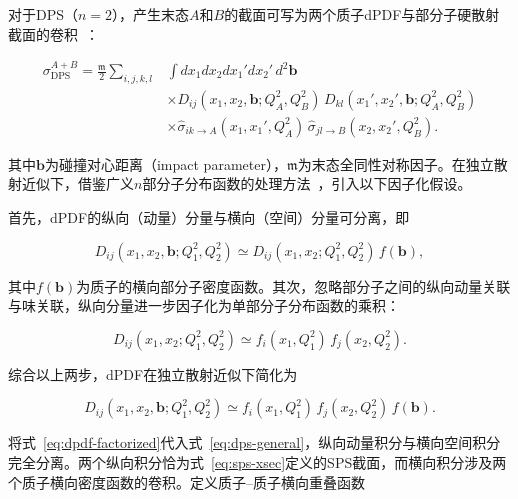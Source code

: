 对于DPS（$n=2$），产生末态$A$和$B$的截面可写为两个质子dPDF与部分子硬散射截面的卷积~\cite{Diehl:2018:DPS-theory,denterriaDoubleTripleNparton2017}：

\begin{equation}
  \label{eq:dps-general}
  \begin{aligned}
    \sigma_{\mathrm{DPS}}^{A+B}
    =
    \frac{\mathfrak{m}}{2} \sum_{i,j,k,l}
    &\int dx_1 dx_2 dx_1' dx_2' \, d^2\mathbf{b} \\
    &\times D_{ij}(x_1, x_2, \mathbf{b}; Q_A^2, Q_B^2) \,
       D_{kl}(x_1', x_2', \mathbf{b}; Q_A^2, Q_B^2) \\
    &\times \hat{\sigma}_{ik \to A}(x_1, x_1', Q_A^2) \,
       \hat{\sigma}_{jl \to B}(x_2, x_2', Q_B^2) .
  \end{aligned}
\end{equation}

其中$\mathbf{b}$为碰撞对心距离（impact parameter），$\mathfrak{m}$为末态全同性对称因子。在独立散射近似下，借鉴广义$n$部分子分布函数的处理方法~\cite{WHQAFHD5,denterriaDoubleTripleNparton2017}，引入以下因子化假设。

首先，dPDF的纵向（动量）分量与横向（空间）分量可分离，即

\begin{equation}
  \label{eq:dpdf-transverse-factorization}
  D_{ij}(x_1, x_2, \mathbf{b}; Q_1^2, Q_2^2)
  \simeq
  D_{ij}(x_1, x_2; Q_1^2, Q_2^2) \, f(\mathbf{b}) ,
\end{equation}

其中$f(\mathbf{b})$为质子的横向部分子密度函数。其次，忽略部分子之间的纵向动量关联与味关联，纵向分量进一步因子化为单部分子分布函数的乘积：

\begin{equation}
  \label{eq:dpdf-long-factorization}
  D_{ij}(x_1, x_2; Q_1^2, Q_2^2)
  \simeq
  f_i(x_1, Q_1^2) \, f_j(x_2, Q_2^2) .
\end{equation}

综合以上两步，dPDF在独立散射近似下简化为

\begin{equation}
  \label{eq:dpdf-factorized}
  D_{ij}(x_1, x_2, \mathbf{b}; Q_1^2, Q_2^2)
  \simeq
  f_i(x_1, Q_1^2) \, f_j(x_2, Q_2^2) \, f(\mathbf{b}) .
\end{equation}

将式~\eqref{eq:dpdf-factorized}代入式~\eqref{eq:dps-general}，纵向动量积分与横向空间积分完全分离。两个纵向积分恰为式~\eqref{eq:sps-xsec}定义的SPS截面，而横向积分涉及两个质子横向密度函数的卷积。定义质子--质子横向重叠函数

